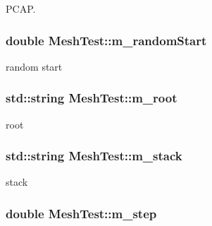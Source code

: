 P\+C\+AP. 

\subsubsection[{\texorpdfstring{m\+\_\+random\+Start}{m_randomStart}}]{\setlength{\rightskip}{0pt plus 5cm}double Mesh\+Test\+::m\+\_\+random\+Start\hspace{0.3cm}{\ttfamily [private]}}\hypertarget{classMeshTest_ac6a22cda2e9c16143fcbbab4e40f5d4e}{}\label{classMeshTest_ac6a22cda2e9c16143fcbbab4e40f5d4e}


random start 

\subsubsection[{\texorpdfstring{m\+\_\+root}{m_root}}]{\setlength{\rightskip}{0pt plus 5cm}std\+::string Mesh\+Test\+::m\+\_\+root\hspace{0.3cm}{\ttfamily [private]}}\hypertarget{classMeshTest_a05b574488e719d40c056938a22028073}{}\label{classMeshTest_a05b574488e719d40c056938a22028073}
root 
\subsubsection[{\texorpdfstring{m\+\_\+stack}{m_stack}}]{\setlength{\rightskip}{0pt plus 5cm}std\+::string Mesh\+Test\+::m\+\_\+stack\hspace{0.3cm}{\ttfamily [private]}}\hypertarget{classMeshTest_a4c4cafe981814fd09018ab2895fbdf79}{}\label{classMeshTest_a4c4cafe981814fd09018ab2895fbdf79}


stack 

\subsubsection[{\texorpdfstring{m\+\_\+step}{m_step}}]{\setlength{\rightskip}{0pt plus 5cm}double Mesh\+Test\+::m\+\_\+step\hspace{0.3cm}{\ttfamily [private]}}\hypertarget{classMeshTest_a0d2d3a9fcecb4d05082e00e86f582131}{}\label{classMeshTest_a0d2d3a9fcecb4d05082e00e86f582131}


